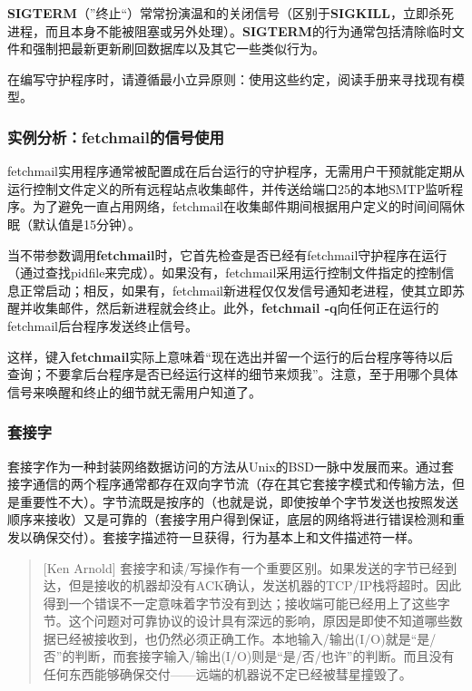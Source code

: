 \documentclass[12pt,oneside]{book}
\begin{document}
\begin{common-format}
\textbf{SIGTERM}（”终止“）常常扮演温和的关闭信号（区别于\textbf{SIGKILL}，立即杀死进程，而且本身不能被阻塞或另外处理）。\textbf{SIGTERM}的行为通常包括清除临时文件和强制把最新更新刷回数据库以及其它一些类似行为。

在编写守护程序时，请遵循最小立异原则：使用这些约定，阅读手册来寻找现有模型。


\subsubsection{实例分析：fetchmail的信号使用}
fetchmail实用程序通常被配置成在后台运行的守护程序，无需用户干预就能定期从运行控制文件定义的所有远程站点收集邮件，并传送给端口25的本地SMTP监听程序。为了避免一直占用网络，fetchmail在收集邮件期间根据用户定义的时间间隔休眠（默认值是15分钟）。

当不带参数调用\textbf{fetchmail}时，它首先检查是否已经有fetchmail守护程序在运行（通过查找pidfile来完成）。如果没有，fetchmail采用运行控制文件指定的控制信息正常启动；相反，如果有，fetchmail新进程仅仅发信号通知老进程，使其立即苏醒并收集邮件，然后新进程就会终止。此外，\textbf{fetchmail -q}向任何正在运行的fetchmail后台程序发送终止信号。

这样，键入\textbf{fetchmail}实际上意味着“现在选出并留一个运行的后台程序等待以后查询；不要拿后台程序是否已经运行这样的细节来烦我”。注意，至于用哪个具体信号来唤醒和终止的细节就无需用户知道了。


\subsubsection{套接字}
套接字作为一种封装网络数据访问的方法从Unix的BSD一脉中发展而来。通过套接字通信的两个程序通常都存在双向字节流（存在其它套接字模式和传输方法，但是重要性不大）。字节流既是按序的（也就是说，即使按单个字节发送也按照发送顺序来接收）又是可靠的（套接字用户得到保证，底层的网络将进行错误检测和重发以确保交付）。套接字描述符一旦获得，行为基本上和文件描述符一样。

\begin{quote}[Ken Arnold]
套接字和读/写操作有一个重要区别。如果发送的字节已经到达，但是接收的机器却没有ACK确认，发送机器的TCP/IP栈将超时。因此得到一个错误不一定意味着字节没有到达；接收端可能已经用上了这些字节。这个问题对可靠协议的设计具有深远的影响，原因是即使不知道哪些数据已经被接收到，也仍然必须正确工作。本地输入/输出(I/O)就是“是/否”的判断，而套接字输入/输出(I/O)则是“是/否/也许”的判断。而且没有任何东西能够确保交付——远端的机器说不定已经被彗星撞毁了。
\end{quote}


\end{common-format}
\end{document}

